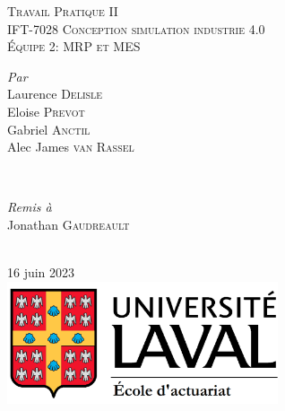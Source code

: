%
%

\begin{titlepage}

\newcommand{\HRule}{\rule{\linewidth}{0.5mm}} %

\center %

\textsc{\LARGE Travail Pratique II}\\[1.5cm]
\textsc{\Large IFT-7028\: Conception simulation industrie 4.0}\\[0.5cm]
\textsc{\large Équipe 2: MRP et MES}\\[0.5cm]


\begin{minipage}{0.4\textwidth}
    \begin{flushleft} \large
    \emph{Par}\\
        Laurence \textsc{Delisle}\\
        Eloise \textsc{Prevot}\\
        Gabriel \textsc{Anctil}\\
        Alec James \textsc{van Rassel}\\
    \end{flushleft}
\end{minipage}
~
\begin{minipage}{0.4\textwidth}
    \begin{flushright} \large
    \emph{Remis à} \\
        Jonathan \textsc{Gaudreault}
    \end{flushright}
\end{minipage}\\[1cm]

{\large 16 juin 2023}\\[1.5cm] %

\includegraphics[width=8cm, keepaspectratio]{src/ulavalogo.png}\\[1cm]

\vfill %

\end{titlepage}
%